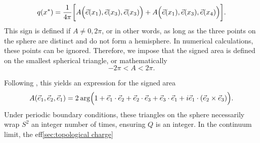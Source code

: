 \begin{equation}
    q(x^*) = \frac{1}{4\pi} \bigg[A\Big(\vec e(x_1), \vec e(x_3), \vec e(x_3)\Big) + A\Big(\vec e(x_1), \vec e(x_3), \vec e(x_4)\Big) \bigg].
\end{equation}
This sign is defined if $A\neq 0, 2\pi$, or in other words, as long as the three points on the sphere are distinct and do not form a hemisphere. In numerical calculations, these points can be ignored. Therefore, we impose that the signed area is defined on the smallest spherical triangle, or mathematically
\begin{equation}
    -2\pi < A < 2\pi.
\end{equation}


Following \cite{berg1981}, this yields an expression for the signed area
\begin{equation}
    A(\vec e_1, \vec e_2, \vec e_1) = 2 \:\mathrm{arg}\Big(1+\vec e_1\cdot\vec e_2 + \vec e_2\cdot\vec e_3 + \vec e_3\cdot\vec e_1 + i\vec e_1 \cdot (\vec e_2\times\vec e_3)\Big).
\end{equation}
Under periodic boundary conditions, these triangles on the sphere necessarily wrap $S^2$ an integer number of times, ensuring $Q$ is an integer. In the continuum limit, the eff\ref{sec:topological charge}

